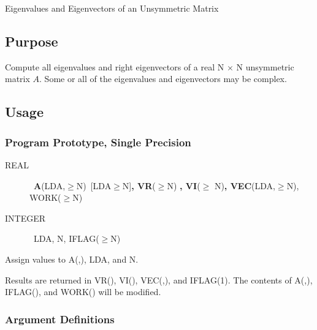 \documentclass[twoside]{MATH77}
\begin{document}
 Eigenvalues and Eigenvectors of an Unsymmetric Matrix


\subsection{Purpose}

Compute all eigenvalues and right eigenvectors of a real N $\times $ N unsymmetric
matrix $A$. Some or all of the eigenvalues and eigenvectors may be complex.

\subsection{Usage}

\subsubsection{Program Prototype, Single Precision}

\begin{description}
\item[REAL]  \ {\bf A}(LDA,$\geq $N)\ [LDA$\geq $N]{\bf , VR}($\geq $N){\bf %
, VI}($\geq $ N){\bf , VEC}(LDA,$\geq $N), WORK($\geq $N)

\item[INTEGER]  \ LDA, N, IFLAG($\geq $N)
\end{description}

Assign values to A(,), LDA, and N.

\begin{center}
\end{center}

Results are returned in VR(), VI(), VEC(,), and IFLAG(1). The contents of
A(,), IFLAG(), and WORK() will be modified.

\subsubsection{Argument Definitions}
\end{document}
